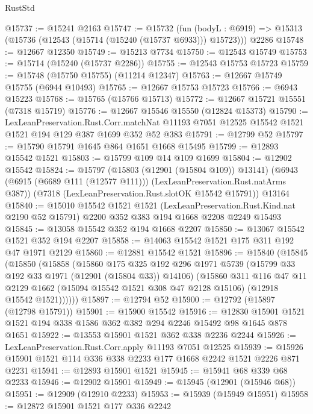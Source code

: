 \begin{lexlean}{RustStd}
\begin{coremodule}
@15737 := @15241 @2163
@15747 := @15732
    (fun (bodyL : @6919) => @15313 (@15736 (@12543 (@15714 (@15240 (@15737 @6933))) @15723)))
    @2286
@15748 := @12667 @12350
@15749 := @15213 @7734
@15750 := @12543 @15749
@15753 := @15714 (@15240 (@15737 @2286))
@15755 := @12543 @15753 @15723
@15759 := @15748 (@15750 @15755) (@11214 @12347)
@15763 := @12667 @15749 @15755 (@6944 @10493)
@15765 := @12667 @15753 @15723
@15766 := @6943 @15223
@15768 := @15765 (@15766 @15713)
@15772 := @12667 @15721 @15551 (@7318 @15719)
@15776 := @12667 @15546 @15550 (@12824 @15373)
@15790 := LexLeanPreservation.Rust.Corr.matchNat
    @11193
    @7051
    @12525
    @15542
    @1521
    @1521
    @194
    @129
    @387
    @1699
    @352
    @52
    @383
@15791 := @12799 @52
@15797 := @15790 @15791 @1645 @864 @1651 @1668 @15495
@15799 := @12893 @15542 @1521
@15803 := @15799 @109 @14 @109 @1699
@15804 := @12902 @15542
@15824 := @15797
    (@15803 (@12901 (@15804 @109)) @13141)
    (@6943 (@6915 (@6689 @111 (@12577 @111))) (LexLeanPreservation.Rust.natArms @387))
    (@7318 (LexLeanPreservation.Rust.slotOK @15542 @15791))
    @13164
@15840 := @15010
    @15542
    @1521
    @1521
    (LexLeanPreservation.Rust.Kind.nat @2190 @52 @15791)
    @2200
    @352
    @383
    @194
    @1668
    @2208
    @2249
    @15493
@15845 := @13058 @15542 @352 @194 @1668 @2207
@15850 := @13067 @15542 @1521 @352 @194 @2207
@15858 := @14063 @15542 @1521 @175 @311 @192 @47 @1971 @2129
@15860 := @12881 @15542 @1521
@15896 := @15840
    (@15845
      (@15850
        (@15858
          (@15860
            @175
            @325
            @192
            @296
            @1971
            @5739
            (@15799 @33 @192 @33 @1971 (@12901 (@15804 @33)) @14106)
            (@15860
              @311
              @116
              @47
              @11
              @2129
              @1662
              (@15094 @15542 @1521 @308 @47 @2128 @15106)
              (@12918 @15542 @1521))))))
@15897 := @12794 @52
@15900 := @12792 (@15897 (@12798 @15791))
@15901 := @15900 @15542
@15916 := @12830 @15901 @1521 @1521 @194 @338 @1586 @362 @382 @294 @2246 @15492 @98 @1645 @878 @1651
@15922 := @13553 @15901 @1521 @362 @338 @2236 @2244
@15926 := LexLeanPreservation.Rust.Corr.apply @11193 @7051 @12525
@15939 := @15926 @15901 @1521 @114 @336 @338 @2233 @177 @1668 @2242 @1521 @2226 @871 @2231
@15941 := @12893 @15901 @1521
@15945 := @15941 @68 @339 @68 @2233
@15946 := @12902 @15901
@15949 := @15945 (@12901 (@15946 @68))
@15951 := @12909 (@12910 @2233)
@15953 := @15939 (@15949 @15951)
@15958 := @12872 @15901 @1521 @177 @336 @2242

\end{coremodule}
\end{lexlean}
